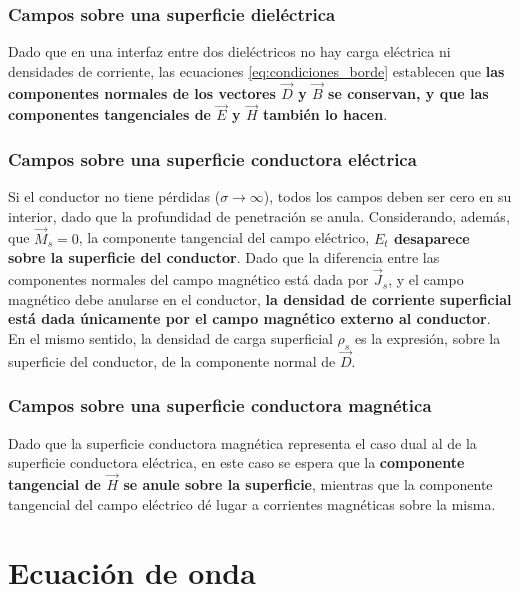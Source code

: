 \subsubsection{Campos sobre una superficie dieléctrica}
Dado que en una interfaz entre dos dieléctricos no hay carga eléctrica ni densidades de corriente, las ecuaciones \ref{eq:condiciones_borde} establecen que \textbf{las componentes normales de los vectores $\vec{D}$ y $\vec{B}$ se conservan, y que las componentes tangenciales de $\vec{E}$ y $\vec{H}$ también lo hacen}.

\subsubsection{Campos sobre una superficie conductora eléctrica}
Si el conductor no tiene pérdidas ($\sigma \rightarrow \infty$), todos los campos deben ser cero en su interior, dado que la profundidad de penetración se anula. Considerando, además, que $\vec{M}_s = 0$, la componente tangencial del campo eléctrico, \textbf{$E_t$ desaparece sobre la superficie del conductor}. Dado que la diferencia entre las componentes normales del campo magnético está dada por $\vec{J}_s$, y el campo magnético debe anularse en el conductor, \textbf{la densidad de corriente superficial está dada únicamente por el campo magnético externo al conductor}. En el mismo sentido, la densidad de carga superficial $\rho_s$ es la expresión, sobre la superficie del conductor, de la componente normal de $\vec{D}$.


\subsubsection{Campos sobre una superficie conductora magnética}
Dado que la superficie conductora magnética representa el caso dual al de la superficie conductora eléctrica, en este caso se espera que la \textbf{componente tangencial de $\vec{H}$ se anule sobre la superficie}, mientras que la componente tangencial del campo eléctrico dé lugar a corrientes magnéticas sobre la misma.


\section{Ecuación de onda}
\label{subsec_eq_de_onda}

